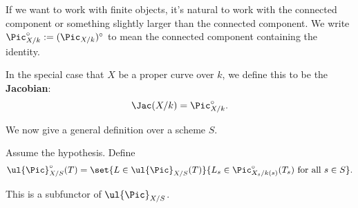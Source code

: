 If we want to work with finite objects, it's natural to work with the connected component or something slightly larger than the connected component.
We write $\Pic^{\circ}_{X/k}:=(\Pic_{X/k})^{\circ}$ to mean the connected component containing the identity.
\begin{ex}
In the special case that $X$ be a proper curve over $k$, we define this to be the \textbf{Jacobian}: %
\[
\Jac(X/k)=\Pic_{X/k}^{\circ}.
\]
\end{ex}

We now give a general definition over a scheme $S$.
\begin{df}
Assume the hypothesis. Define
\[
\ul{\Pic}_{X/S}^{\circ}(T)=\set{L\in \ul{\Pic}_{X/S}(T)}{L_s\in \Pic_{X_s/k(s)}^{\circ}(T_s)\text{ for all }s\in S}.
\]
\end{df}
This is a subfunctor of $\ul{\Pic}_{X/S}$.

